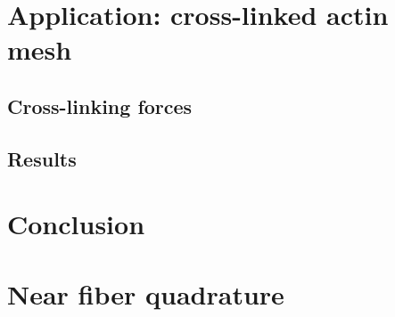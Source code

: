 \documentclass[12pt]{article}
\begin{document}
\section{Application: cross-linked actin mesh}
\subsection{Cross-linking forces}
\subsection{Results}

\section{Conclusion}

\appendix

\section{Near fiber quadrature \label{sec:nearfibtests}}






\end{document}
